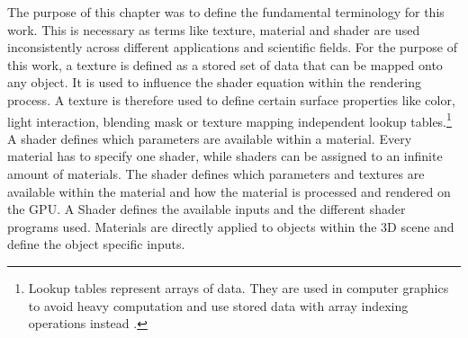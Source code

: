 The purpose of this chapter was to define the fundamental terminology for this work. This is necessary as terms like texture, material and shader are used inconsistently across  different applications and scientific fields. For the purpose of this work, a texture is defined as a stored set of data that can be mapped onto any object. It is used to influence the shader equation within the rendering process. A texture is therefore used to define certain surface properties like color, light interaction, blending mask or texture mapping independent lookup tables.\footnote{Lookup tables represent arrays of data. They are used in computer graphics to avoid heavy computation and use stored data with array indexing operations instead \cite{wiki2018LookupTable}.} 
A shader defines which parameters are available within a material. Every material has to specify one shader, while shaders can be assigned to an infinite amount of materials. The shader defines which parameters and textures are available within the material and how the material is processed and rendered on the GPU. A Shader defines the available inputs and the different shader programs used. Materials are directly applied to objects within the 3D scene and define the object specific inputs.    

